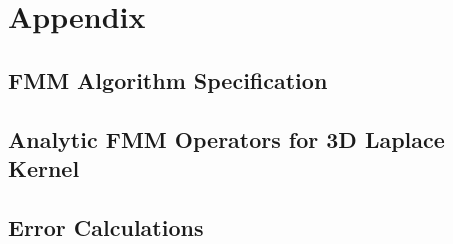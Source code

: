 \chapter{Appendix}
\section{FMM Algorithm Specification}

\section{Analytic FMM Operators for 3D Laplace Kernel}

\section{Error Calculations}
